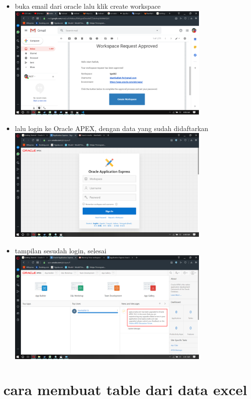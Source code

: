 \documentclass[a4paper,12pt]{report}
\begin{document}
\begin{itemize}
	\item buka email dari oracle lalu klik create workspace\\ \includegraphics[width=10cm]{gambar/Screenshot (119).png} 
	\item lalu login ke Oracle APEX, dengan data yang sudah didaftarkan\\
\includegraphics[width=10cm]{gambar/Screenshot (114).png} 
	\item tampilan sesudah login, selesai\\
\includegraphics[width=10cm]{gambar/Screenshot (115).png} 
\end{itemize}
\section*{cara membuat table dari data excel}
\end{document}

